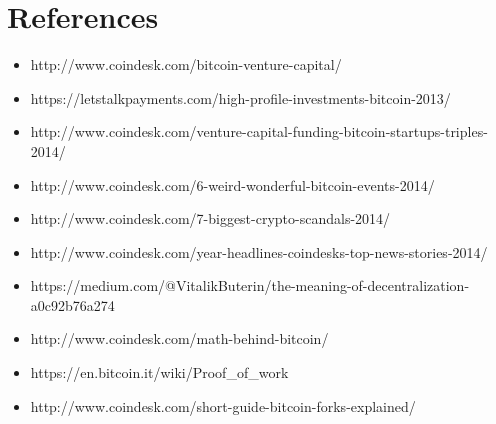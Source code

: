 \documentclass[11pt]{article}
\begin{document}
    
    \setlength{\parindent}{0pt}
    
    \section*{References}
    \begin{itemize}
        \item http://www.coindesk.com/bitcoin-venture-capital/
        \item https://letstalkpayments.com/high-profile-investments-bitcoin-2013/ 
        \item http://www.coindesk.com/venture-capital-funding-bitcoin-startups-triples-2014/ 
        \item http://www.coindesk.com/6-weird-wonderful-bitcoin-events-2014/ 
        \item http://www.coindesk.com/7-biggest-crypto-scandals-2014/ 
        \item http://www.coindesk.com/year-headlines-coindesks-top-news-stories-2014/ 
        \item https://medium.com/@VitalikButerin/the-meaning-of-decentralization-a0c92b76a274 
        \item http://www.coindesk.com/math-behind-bitcoin/
        \item https://en.bitcoin.it/wiki/Proof\_of\_work
        \item http://www.coindesk.com/short-guide-bitcoin-forks-explained/
        
    \end{itemize}
    
\end{document}
